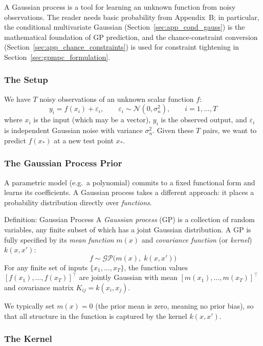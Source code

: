 A Gaussian process is a tool for learning an unknown function from noisy observations. The reader needs basic probability from Appendix~B; in particular, the conditional multivariate Gaussian (Section~\ref{sec:app_cond_gauss}) is the mathematical foundation of GP prediction, and the chance-constraint conversion (Section~\ref{sec:app_chance_constraints}) is used for constraint tightening in Section~\ref{sec:gpmpc_formulation}.

\subsubsection*{The Setup}

We have $T$ noisy observations of an unknown scalar function $f$:
\[
y_i = f(x_i) + \varepsilon_i, \qquad \varepsilon_i \sim \mathcal{N}(0, \sigma_n^2), \qquad i = 1, \ldots, T
\]
where $x_i$ is the input (which may be a vector), $y_i$ is the observed output, and $\varepsilon_i$ is independent Gaussian noise with variance $\sigma_n^2$. Given these $T$ pairs, we want to predict $f(x_*)$ at a new test point $x_*$.

\subsubsection*{The Gaussian Process Prior}

A parametric model (e.g.\ a polynomial) commits to a fixed functional form and learns its coefficients. A Gaussian process takes a different approach: it places a probability distribution directly over \emph{functions}.

\begin{defnbox}{Definition: Gaussian Process}
	A \emph{Gaussian process} (GP) is a collection of random variables, any finite subset of which has a joint Gaussian distribution. A GP is fully specified by its \emph{mean function} $m(x)$ and \emph{covariance function} (or \emph{kernel}) $k(x, x')$:
	\[
	f \sim \mathcal{GP}\bigl(m(x),\; k(x, x')\bigr)
	\]
	For any finite set of inputs $\{x_1, \ldots, x_T\}$, the function values $[f(x_1), \ldots, f(x_T)]^\top$ are jointly Gaussian with mean $[m(x_1), \ldots, m(x_T)]^\top$ and covariance matrix $K_{ij} = k(x_i, x_j)$.
\end{defnbox}

We typically set $m(x) = 0$ (the prior mean is zero, meaning no prior bias), so that all structure in the function is captured by the kernel $k(x, x')$.

\subsubsection*{The Kernel}

